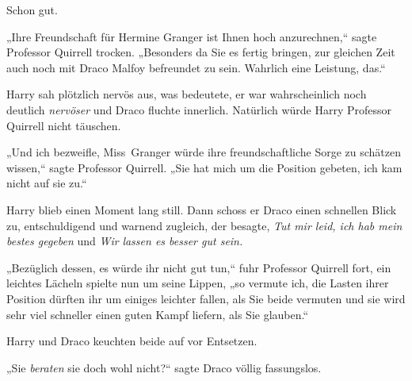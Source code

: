 Schon gut.

„Ihre Freundschaft für Hermine Granger ist Ihnen hoch anzurechnen,“ sagte Professor Quirrell trocken. „Besonders da Sie es fertig bringen, zur gleichen Zeit auch noch mit Draco Malfoy befreundet zu sein. Wahrlich eine Leistung, das.“

Harry sah plötzlich nervös aus, was bedeutete, er war wahrscheinlich noch deutlich \emph{nervöser} und Draco fluchte innerlich. Natürlich würde Harry Professor Quirrell nicht täuschen.

„Und ich bezweifle, Miss~Granger würde ihre freundschaftliche Sorge zu schätzen wissen,“ sagte Professor Quirrell. „Sie hat mich um die Position gebeten, ich kam nicht auf sie zu.“

Harry blieb einen Moment lang still. Dann schoss er Draco einen schnellen Blick zu, entschuldigend und warnend zugleich, der besagte, \emph{Tut mir leid, ich hab mein bestes gegeben} und \emph{Wir} \emph{lassen es besser gut sein.}

„Bezüglich dessen, es würde ihr nicht gut tun,“ fuhr Professor Quirrell fort, ein leichtes Lächeln spielte nun um seine Lippen, „so vermute ich, die Lasten ihrer Position dürften ihr um einiges leichter fallen, als Sie beide vermuten und sie wird sehr viel schneller einen guten Kampf liefern, als Sie glauben.“

Harry und Draco keuchten beide auf vor Entsetzen.

„Sie \emph{beraten} sie doch wohl nicht?“ sagte Draco völlig fassungslos.

